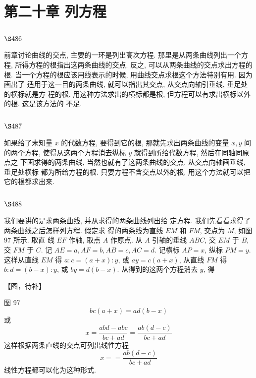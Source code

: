 \chapter{第二十章 列方程}

\section{$\S 486$}

前章讨论曲线的交点, 主要的一环是列出高次方程. 那里是从两条曲线列出一个方 程, 所得方程的根指出这两条曲线的交点. 反之, 可以从两条曲线的交点求出方程的根. 当一个方程的根应该用线表示的时候, 用曲线交点求根这个方法特别有用. 因为画出了 适用于这一目的两条曲线, 就可以指出其交点, 从交点向轴引垂线, 垂足处的横标就是方 程的根. 用这种方法求出的横标都是根, 但方程可以有求出横标以外的根. 这是该方法的 不足.

\section{$\S 487$}

如果给了末知量 $x$ 的代数方程, 要得到它的根, 那就先求出两条曲线的变量 $x, y$ 间 的两个方程, 使得从这两个方程消去纵标 $y$ 就得到所给代数方程, 然后在同轴同原点之 下画求得的两条曲线, 当然也就有了这两条曲线的交点. 从交点向轴画垂线, 垂足处横标 都为所给方程的根. 只要方程不含交点以外的根, 用这个方法就可以把它的根都求出来.

\section{$\S 488$}

我们要讲的是求两条曲线, 并从求得的两条曲线列出给 定方程. 我们先看看求得了两条曲线之后怎样列方程. 假定求 得的两条线为直线 $E M$ 和 $F M$, 交点为 $M$, 如图 97 所示. 取直 线 $E F$ 作轴, 取点 $A$ 作原点. 从 $A$ 引轴的垂线 $A B C$, 交 $E M$ 于 $B$, 交 $F M$ 于 $C$. 记 $A E=a, A F=b, A B=c, A C=d$. 记横标 $A P=x$, 纵标 $P M=y$. 这样从直线 $E M$ 得 $a: c=(a+x): y$, 或 $a y=c(a+x)$, 从直线 $F M$ 得 $b: d=(b-x): y$, 或 $b y=d(b-x)$. 从得到的这两个方程消去 $y$, 得


【图，待补】

图 97 
\[
b c(a+x)=a d(b-x)
\]
或
\[
x=\frac{a b d-a b c}{b c+a d}=\frac{a b(d-c)}{b c+a d}
\]
这样根据两条直线的交点可列出线性方程 
\[
x==\frac{a b(d-c)}{b c+a d}
\]
线性方程都可以化为这种形式.


